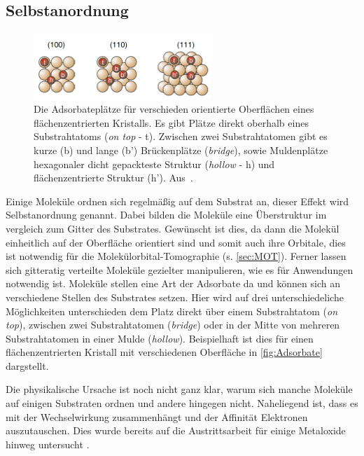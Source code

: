         \subsection{Selbstanordnung}
            \begin{figure}
                \centering
                \includegraphics[width=0.6\textwidth]{./content/Adsorbate}
                \caption{Die Adsorbateplätze für verschieden orientierte Oberflächen eines flächenzentrierten Kristalls.
                Es gibt Plätze direkt oberhalb eines Substrahtatoms (\textit{on top} - t).
                Zwischen zwei Substrahtatomen gibt es kurze (b) und lange (b') Brückenplätze (\textit{bridge}), sowie Muldenplätze hexagonaler dicht gepackteste Struktur (\textit{hollow} - h) und flächenzentrierte Struktur (h'). Aus~\cite{Fauster}.}
                \label{fig:Adsorbate}
            \end{figure}
            Einige Moleküle ordnen sich regelmäßig auf dem Substrat an, dieser Effekt wird Selbstanordnung genannt.
            Dabei bilden die Moleküle eine Überstruktur im vergleich zum Gitter des Substrates.
            Gewünscht ist dies, da dann die Molekül einheitlich auf der Oberfläche orientiert sind und somit auch ihre Orbitale, dies ist notwendig für die Molekülorbital-Tomographie (s. \autoref{sec:MOT}).
            Ferner lassen sich gitteratig verteilte Moleküle gezielter manipulieren, wie es für Anwendungen notwendig ist.
            Moleküle stellen eine Art der Adsorbate da und können sich an verschiedene Stellen des Substrates setzen.
            Hier wird auf drei unterschiedeliche Möglichkeiten unterschieden dem Platz direkt über einem Substrahtatom (\textit{on top}), zwischen zwei Substrahtatomen (\textit{bridge}) oder in der Mitte von mehreren Substrahtatomen in einer Mulde (\textit{hollow}).
            Beispielhaft ist dies für einen flächenzentrierten Kristall mit verschiedenen Oberfläche in \autoref{fig:Adsorbate} dargstellt.

            Die physikalische Ursache ist noch nicht ganz klar, warum sich manche Moleküle auf einigen Substraten ordnen und andere hingegen nicht.
            Naheliegend ist, dass es mit der Wechselwirkung zusammenhängt und der Affinität Elektronen auszutauschen.
            Dies wurde bereits auf die Austrittsarbeit für einige Metaloxide hinweg untersucht \cite{greiner_universal_2012}.

